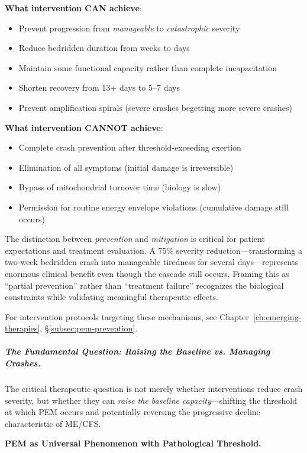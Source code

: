 \textbf{What intervention CAN achieve}:
\begin{itemize}
    \item Prevent progression from \textit{manageable} to \textit{catastrophic} severity
    \item Reduce bedridden duration from weeks to days
    \item Maintain some functional capacity rather than complete incapacitation
    \item Shorten recovery from 13+ days to 5--7 days
    \item Prevent amplification spirals (severe crashes begetting more severe crashes)
\end{itemize}

\textbf{What intervention CANNOT achieve}:
\begin{itemize}
    \item Complete crash prevention after threshold-exceeding exertion
    \item Elimination of all symptoms (initial damage is irreversible)
    \item Bypass of mitochondrial turnover time (biology is slow)
    \item Permission for routine energy envelope violations (cumulative damage still occurs)
\end{itemize}

The distinction between \textit{prevention} and \textit{mitigation} is critical for patient expectations and treatment evaluation. A 75\% severity reduction---transforming a two-week bedridden crash into manageable tiredness for several days---represents enormous clinical benefit even though the cascade still occurs. Framing this as ``partial prevention'' rather than ``treatment failure'' recognizes the biological constraints while validating meaningful therapeutic effects.

For intervention protocols targeting these mechanisms, see Chapter~\ref{ch:emerging-therapies}, \S\ref{subsec:pem-prevention}.

\subparagraph{The Fundamental Question: Raising the Baseline vs. Managing Crashes.}

The critical therapeutic question is not merely whether interventions reduce crash severity, but whether they can \textit{raise the baseline capacity}---shifting the threshold at which PEM occurs and potentially reversing the progressive decline characteristic of ME/CFS.

\textbf{PEM as Universal Phenomenon with Pathological Threshold.}

